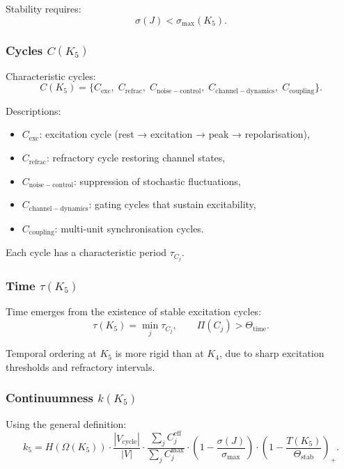 Stability requires:
\[
\sigma(J) < \sigma_{\max}(K_5).
\]

\subsubsection{Cycles \texorpdfstring{$C(K_5)$}{C(K_5)}}

Characteristic cycles:
\[
C(K_5)
= \{ C_{\mathrm{exc}},\;
     C_{\mathrm{refrac}},\;
     C_{\mathrm{noise-control}},\;
     C_{\mathrm{channel-dynamics}},\;
     C_{\mathrm{coupling}} \}.
\]

Descriptions:
\begin{itemize}
    \item $C_{\mathrm{exc}}$: excitation cycle (rest → excitation →
          peak → repolarisation),
    \item $C_{\mathrm{refrac}}$: refractory cycle restoring channel
          states,
    \item $C_{\mathrm{noise-control}}$: suppression of stochastic
          fluctuations,
    \item $C_{\mathrm{channel-dynamics}}$: gating cycles that sustain
          excitability,
    \item $C_{\mathrm{coupling}}$: multi-unit synchronisation cycles.
\end{itemize}

Each cycle has a characteristic period $\tau_{C_j}$.

\subsubsection{Time \texorpdfstring{$\tau(K_5)$}{\tau(K_5)}}

Time emerges from the existence of stable excitation cycles:
\[
\tau(K_5)
    = \min_j \tau_{C_j},
\qquad
\Pi(C_j) > \Theta_{\mathrm{time}}.
\]

Temporal ordering at $K_5$ is more rigid than at $K_4$, due to sharp
excitation thresholds and refractory intervals.

\subsubsection{Continuumness \texorpdfstring{$k(K_5)$}{k(K_5)}}

Using the general definition:
\[
k_5
= H(\Omega(K_5))
  \cdot\frac{|V_{\mathrm{cycle}}|}{|V|}
  \cdot\frac{\sum_j C_j^{\mathrm{eff}}}{\sum_j C_j^{\max}}
  \cdot\left(1-\frac{\sigma(J)}{\sigma_{\max}}\right)
  \cdot\left(1-\frac{T(K_5)}{\Theta_{\mathrm{stab}}}\right)_+.
\]

